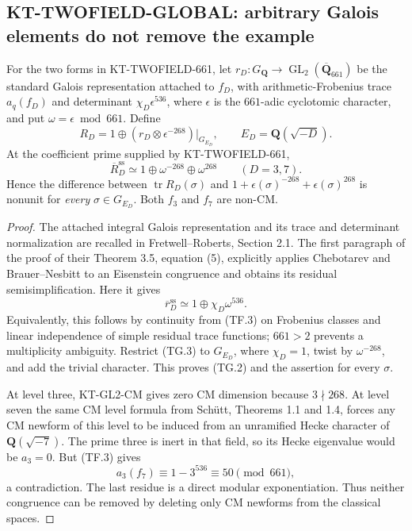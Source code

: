 \subsection{KT-TWOFIELD-GLOBAL: arbitrary Galois elements do not remove the example}
\label{sec:kt-twofield-global}

\begin{corollary}
For the two forms in KT-TWOFIELD-661, let
$r_D:G_{\mathbf Q}\to\operatorname{GL}_2(
\overline{\mathbf Q}_{661})$ be the standard Galois
representation attached to $f_D$, with arithmetic-Frobenius
trace $a_q(f_D)$ and determinant
$\chi_D\epsilon^{536}$, where $\epsilon$ is the
$661$-adic cyclotomic character, and put
$\omega=\epsilon\bmod661$. Define
\[
 R_D=1\oplus(r_D\otimes\epsilon^{-268})|_{G_{E_D}},
 \qquad E_D=\mathbf Q(\sqrt{-D}).
                                                               \tag{TG.1}
\]
At the coefficient prime supplied by KT-TWOFIELD-661,
\[
 \overline R_D^{\mathrm{ss}}\simeq
          1\oplus\omega^{-268}\oplus\omega^{268}
                    \qquad(D=3,7).
                                                               \tag{TG.2}
\]
Hence the difference between $\operatorname{tr}R_D(\sigma)$
and $1+\epsilon(\sigma)^{-268}+\epsilon(\sigma)^{268}$
is nonunit for \emph{every} $\sigma\in G_{E_D}$.
Both $f_3$ and $f_7$ are non-CM.
\end{corollary}

\begin{proof}
The attached integral Galois representation and its trace
and determinant normalization are recalled in
Fretwell--Roberts, Section 2.1. The first paragraph of
the proof of their Theorem 3.5, equation (5), explicitly
applies Chebotarev and Brauer--Nesbitt to an Eisenstein
congruence and obtains its residual semisimplification.
Here it gives
\[
              \overline r_D^{\mathrm{ss}}
                     \simeq1\oplus\chi_D\omega^{536}.
                                                               \tag{TG.3}
\]
Equivalently, this follows by continuity from (TF.3) on
Frobenius classes and linear independence of simple
residual trace functions; $661>2$ prevents a multiplicity
ambiguity. Restrict (TG.3) to $G_{E_D}$, where $\chi_D=1$,
twist by $\omega^{-268}$, and add the trivial character.
This proves (TG.2) and the assertion for every $\sigma$.

At level three, KT-GL2-CM gives zero CM dimension because
$3\nmid268$. At level seven the same CM level formula
from Sch\"utt, Theorems 1.1 and 1.4, forces any CM newform
of this level to be induced from an unramified Hecke
character of $\mathbf Q(\sqrt{-7})$. The prime three is
inert in that field, so its Hecke eigenvalue would be
$a_3=0$. But (TF.3) gives
\[
                     a_3(f_7)\equiv1-3^{536}
                                      \equiv50\pmod{661},
                                                               \tag{TG.4}
\]
a contradiction. The last residue is a direct modular
exponentiation. Thus neither congruence can be removed
by deleting only CM newforms from the classical spaces.
\end{proof}

